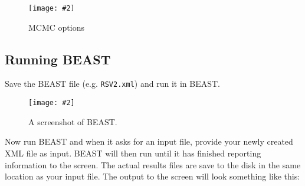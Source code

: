 \documentclass[12pt]{article}
\newcommand{\includeimage}[2][]{%
\texttt{[image: \#2]}
}
\begin{document}
\begin{figure}
\centering	
\includeimage[width=0.8\textwidth]{figures/BEAUti_mcmc}
\label{fig:BEAUti_mcmc}
\caption{MCMC options}
\end{figure}


\subsection*{Running BEAST}

Save the BEAST file (e.g. \texttt{RSV2.xml}) and run it in BEAST.

\begin{figure}
\centering	
\includeimage[width=0.7\textwidth]{figures/BEAST}
\caption{A screenshot of BEAST.}
\label{fig:BEAST}
\end{figure}

Now run BEAST and when it asks for an input file, provide your newly
created XML file as input. BEAST will then run until it has finished
reporting information to the screen. The actual results files are
save to the disk in the same location as your input file. The output to the screen will
look something like this: 
\end{document}
